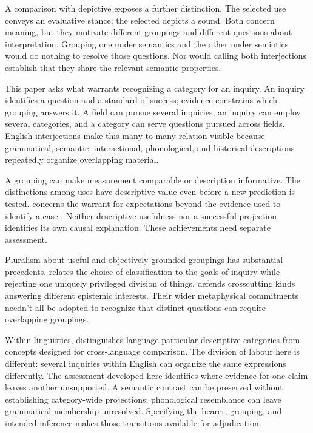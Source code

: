 \documentclass[12pt]{article}
\begin{document}
A comparison with depictive  exposes a further distinction.
The selected  use conveys an evaluative stance; the selected
 depicts a sound. Both concern meaning, but they motivate
different groupings and different questions about interpretation. Grouping
one under semantics and the other under semiotics would do nothing to
resolve those questions. Nor would calling both interjections establish
that they share the relevant semantic properties.

This paper asks what warrants recognizing a category for an inquiry.
An inquiry identifies a question and a standard of success; evidence
constrains which grouping answers it. A field can pursue several inquiries,
an inquiry can employ several categories, and a category can serve questions
pursued across fields. English interjections make this many-to-many relation
visible because grammatical, semantic, interactional, phonological, and
historical descriptions repeatedly organize overlapping material.

A grouping can make measurement comparable or description informative.
The distinctions among  uses have descriptive value even
before a new prediction is tested.  concerns the
warrant for expectations beyond the evidence used to identify a case
\citep{Goodman1955}. Neither descriptive usefulness nor a successful
projection identifies its own causal explanation. These achievements
need separate assessment.

Pluralism about useful and objectively grounded groupings has substantial
precedents. \textcite[5--7, 17--18]{dupre1993disorder} relates the choice of
classification to the goals of inquiry while rejecting one uniquely
privileged division of things. \textcite[63--64, 69--72]{khalidi2013}
defends crosscutting kinds answering different epistemic interests.
Their wider metaphysical commitments needn't all be adopted to recognize
that distinct questions can require overlapping groupings.

Within linguistics, \textcite[663, 666, 680]{haspelmath2010} distinguishes
language-particular descriptive categories from concepts designed for
cross-language comparison. The division of labour here is different:
several inquiries within English can organize the same expressions
differently. The assessment developed here identifies where evidence
for one claim leaves another unsupported. A semantic contrast can be
preserved without establishing category-wide projections; phonological
resemblance can leave grammatical membership unresolved. Specifying
the bearer, grouping, and intended inference makes those transitions
available for adjudication.
\end{document}
